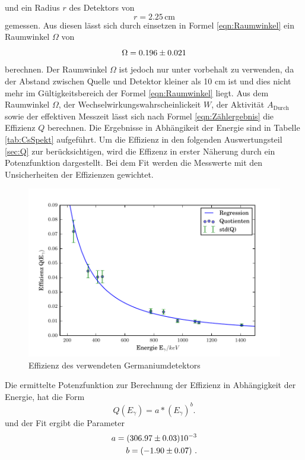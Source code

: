 und ein Radius $r$ des Detektors von
\begin{equation}
  r = 2.25 \, \text{cm}
\end{equation}
gemessen. Aus diesen lässt sich durch einsetzen in Formel \ref{eqn:Raumwinkel} ein Raumwinkel $\Omega$ von
\begin{equation}
  \Omega = \num{0.196 +- 0.021}
  \label{eqn:Raum}
\end{equation}
berechnen. Der Raumwinkel $\Omega$ ist jedoch nur unter vorbehalt zu verwenden, da der Abstand zwischen Quelle und Detektor kleiner als 10 cm ist und dies nicht mehr im Gültigkeitsbereich der Formel \ref{eqn:Raumwinkel} liegt. Aus dem Raumwinkel $\Omega$, der Wechselwirkungswahrscheinlickeit $W$, der Aktivität $A_\text{Durch}$ sowie der effektiven Messzeit lässt sich nach Formel \ref{eqn:Zählergebnis} die Effizienz $Q$ berechnen. Die Ergebnisse in Abhängikeit der Energie sind in Tabelle \ref{tab:CsSpekt} aufgeführt. Um die Effizienz in den folgenden Auswertungsteil \ref{sec:Q} zur berücksichtigen, wird die Effizenz in erster Näherung durch ein Potenzfunktion dargestellt. Bei dem Fit werden die Messwerte mit den Unsicherheiten der Effizienzen gewichtet. 

\begin{figure}[H]
  \centering
  \includegraphics[width=\textwidth]{./build/Effizienz.pdf}
  \caption{Effizienz des verwendeten Germaniumdetektors}
  \label{fig:Efi}
\end{figure}

Die ermittelte Potenzfunktion zur Berechnung der Effizienz in Abhängigkeit der Energie, hat die Form
\begin{equation}
  Q(E_\gamma)=  a*\left( E_\gamma \right)^{b} .
  \label{eqn:QCs}
\end{equation}
und der Fit ergibt die Parameter 
\begin{eqnarray}
  a = (\num{306.97 +- 0.03})10^{-3} \\
  b = (\num{-1.90 +- 0.07}) \ .
\end{eqnarray}
 
